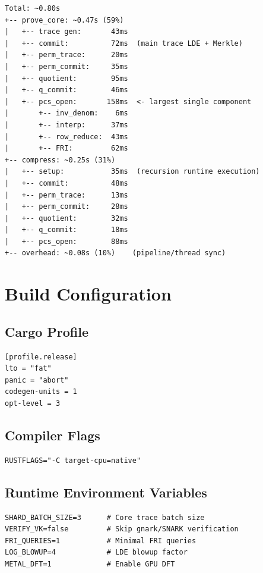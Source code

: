 \documentclass[11pt,a4paper]{article}
\begin{document}
\begin{lstlisting}
Total: ~0.80s
+-- prove_core: ~0.47s (59%)
|   +-- trace gen:       43ms
|   +-- commit:          72ms  (main trace LDE + Merkle)
|   +-- perm_trace:      20ms
|   +-- perm_commit:     35ms
|   +-- quotient:        95ms
|   +-- q_commit:        46ms
|   +-- pcs_open:       158ms  <- largest single component
|       +-- inv_denom:    6ms
|       +-- interp:      37ms
|       +-- row_reduce:  43ms
|       +-- FRI:         62ms
+-- compress: ~0.25s (31%)
|   +-- setup:           35ms  (recursion runtime execution)
|   +-- commit:          48ms
|   +-- perm_trace:      13ms
|   +-- perm_commit:     28ms
|   +-- quotient:        32ms
|   +-- q_commit:        18ms
|   +-- pcs_open:        88ms
+-- overhead: ~0.08s (10%)    (pipeline/thread sync)
\end{lstlisting}

\section{Build Configuration}

\subsection{Cargo Profile}

\begin{lstlisting}
[profile.release]
lto = "fat"
panic = "abort"
codegen-units = 1
opt-level = 3
\end{lstlisting}

\subsection{Compiler Flags}

\begin{lstlisting}
RUSTFLAGS="-C target-cpu=native"
\end{lstlisting}

\subsection{Runtime Environment Variables}

\begin{lstlisting}
SHARD_BATCH_SIZE=3      # Core trace batch size
VERIFY_VK=false         # Skip gnark/SNARK verification
FRI_QUERIES=1           # Minimal FRI queries
LOG_BLOWUP=4            # LDE blowup factor
METAL_DFT=1             # Enable GPU DFT
\end{lstlisting}
\end{document}
